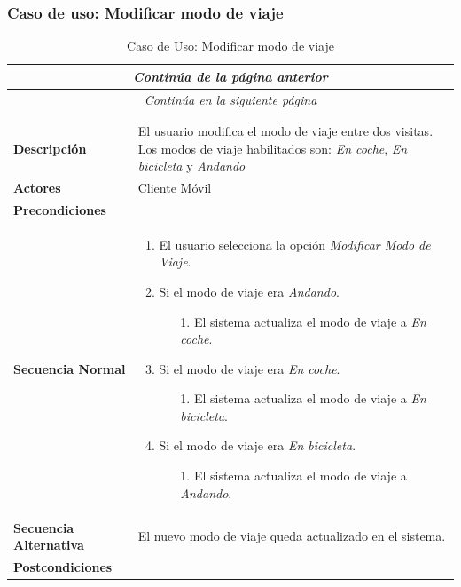 \newpage
\subsubsection*{Caso de uso: Modificar modo de viaje }
\begin{longtable}{| p{4cm} | p{10cm} |}
\endfirsthead
\multicolumn{2}{c}{\textit{Continúa de la página anterior}}\\[12pt]
\hline
\endhead
\hline
\multicolumn{2}{c}{\textit{Continúa en la siguiente página}} \\
\endfoot
\hline
\caption{Caso de Uso: Modificar modo de viaje}\label{fig:1}\\
\endlastfoot


\hline
\multicolumn{2}{|c|}{\textbf{CU$<$18$>$ - Modificar Modo de Viaje}} \\

\hline
\textbf{Descripción} &
El usuario modifica el modo de viaje entre dos visitas. Los modos de viaje habilitados son: \textit{En coche}, \textit{En bicicleta} y \textit{Andando}\\

\hline
\textbf{Actores} &
Cliente Móvil\\

\hline
\textbf{Precondiciones} &
\\

\hline
\textbf{Secuencia Normal} &\mbox{}\par\vspace{-\baselineskip}
\begin{enumerate}[leftmargin=0.7cm, topsep=0.1cm]
\item El usuario selecciona la opción \textit{Modificar Modo de Viaje}.
\item Si el modo de viaje era \textit{Andando}.
	\begin{itemize}
	\item [1.] El sistema actualiza el modo de viaje a \textit{En coche}.
	\end{itemize}
\item Si el modo de viaje era \textit{En coche}.
	\begin{itemize}
	\item [1.] El sistema actualiza el modo de viaje a \textit{En bicicleta}.
	\end{itemize}
\item Si el modo de viaje era \textit{En bicicleta}.
	\begin{itemize}
	\item [1.] El sistema actualiza el modo de viaje a \textit{Andando}.
	\end{itemize}

\end{enumerate}


\\
\hline
\textbf{Secuencia Alternativa} &\mbox{}\par\vspace{-\baselineskip}
El nuevo modo de viaje queda actualizado en el sistema.\\

\hline
\textbf{Postcondiciones} & \\
\hline
\end{longtable}



